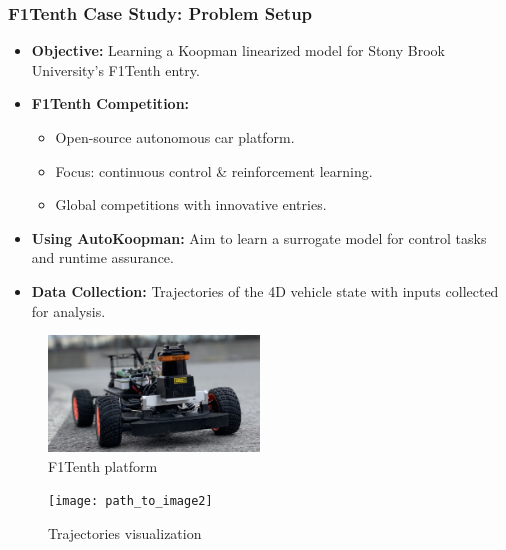 \documentclass[shortpres,aspectratio=43]{beamer}
\begin{document}
\begin{frame}
\frametitle{F1Tenth Case Study: Problem Setup}
\begin{itemize}
    \item<1-> \textbf{Objective:} Learning a Koopman linearized model for Stony Brook University's F1Tenth entry.
    \item<2-> \textbf{F1Tenth Competition:}
    \begin{itemize}
        \item Open-source autonomous car platform.
        \item Focus: continuous control \& reinforcement learning.
        \item Global competitions with innovative entries.
    \end{itemize}
    \item<3-> \textbf{Using AutoKoopman:} Aim to learn a surrogate model for control tasks and runtime assurance.
    \item<4-> \textbf{Data Collection:} Trajectories of the 4D vehicle state with inputs collected for analysis.
\end{itemize}
\begin{figure}
  \centering
  \includegraphics[width=0.5\textwidth]{./img/f1tenth.png}
  \caption{F1Tenth platform}
\end{figure}
\begin{figure}
  \centering
  \texttt{[image: path\_to\_image2]} %
  \caption{Trajectories visualization}
\end{figure}
\end{frame}
\end{document}

